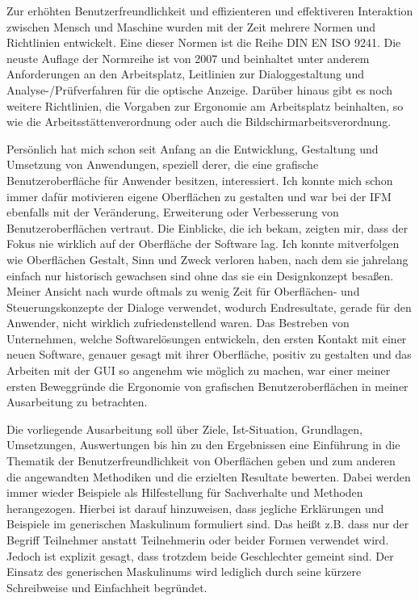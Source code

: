 Zur erhöhten Benutzerfreundlichkeit und effizienteren und effektiveren Interaktion zwischen Mensch und Maschine wurden mit der Zeit mehrere Normen und Richtlinien entwickelt. Eine dieser Normen ist die Reihe DIN EN ISO 9241. Die neuste Auflage der Normreihe ist von 2007 und beinhaltet unter anderem Anforderungen an den Arbeitsplatz, Leitlinien zur Dialoggestaltung und Analyse-/Prüfverfahren für die optische Anzeige. Darüber hinaus gibt es noch weitere Richtlinien, die Vorgaben zur Ergonomie am Arbeitsplatz beinhalten, so wie die Arbeitsstättenverordnung oder auch die Bildschirmarbeitsverordnung.

Persönlich hat mich schon seit Anfang an die Entwicklung, Gestaltung und Umsetzung von Anwendungen, speziell derer, die eine grafische Benutzeroberfläche für Anwender besitzen, interessiert. Ich konnte mich schon immer dafür motivieren eigene Oberflächen zu gestalten und war bei der \gls{IFM} ebenfalls mit der Veränderung, Erweiterung oder Verbesserung von Benutzeroberflächen vertraut. Die Einblicke, die ich bekam, zeigten mir, dass der Fokus nie wirklich auf der Oberfläche der Software lag. Ich konnte mitverfolgen wie Oberflächen Gestalt, Sinn und Zweck verloren haben, nach dem sie jahrelang einfach nur historisch gewachsen sind ohne das sie ein Designkonzept besaßen. Meiner Ansicht nach wurde oftmals zu wenig Zeit für Oberflächen- und Steuerungskonzepte der Dialoge verwendet, wodurch Endresultate, gerade für den Anwender, nicht wirklich zufriedenstellend waren. Das Bestreben von Unternehmen, welche Softwarelösungen entwickeln, den ersten Kontakt mit einer neuen Software, genauer gesagt mit ihrer Oberfläche, positiv zu gestalten und das Arbeiten mit der \gls{GUI} so angenehm wie möglich zu machen, war einer meiner ersten Beweggründe die Ergonomie von grafischen Benutzeroberflächen in meiner Ausarbeitung zu betrachten. 

Die vorliegende Ausarbeitung soll über Ziele, Ist-Situation, Grundlagen, Umsetzungen, Auswertungen bis hin zu den Ergebnissen eine Einführung in die Thematik der Benutzerfreundlichkeit von Oberflächen geben und zum anderen die angewandten Methodiken und die erzielten Resultate bewerten. Dabei werden immer wieder Beispiele als Hilfestellung für Sachverhalte und Methoden herangezogen. Hierbei ist darauf hinzuweisen, dass jegliche Erklärungen und Beispiele im generischen Maskulinum formuliert sind. Das heißt z.B. dass nur der Begriff Teilnehmer anstatt Teilnehmerin oder beider Formen verwendet wird. Jedoch ist explizit gesagt, dass trotzdem beide Geschlechter gemeint sind. Der Einsatz des generischen Maskulinums wird lediglich durch seine kürzere Schreibweise und Einfachheit begründet.
